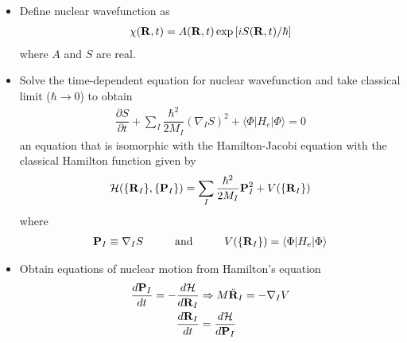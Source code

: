 \documentclass[slidestop,mathserif,compress,xcolor=svgnames]{beamer}
\begin{document}
\begin{frame}
\footnotesize{
\begin{itemize}
\item Define nuclear wavefunction as
\begin{align*}
\chi({\bf R},t) = A({\bf R},t)\exp\left[iS({\bf R},t)/\hbar\right]
\end{align*}
where $A$ and $S$ are real.
\item Solve the time-dependent equation for nuclear wavefunction and take classical limit ($\hbar\rightarrow0$) to obtain 
\begin{align*}
\dfrac{\partial S}{\partial t} + \sum_I\dfrac{\hbar^2}{2M_I}(\nabla_IS)^2 + \langle\Phi|H_e|\Phi\rangle = 0
\end{align*}
an equation that is isomorphic with the Hamilton-Jacobi equation with the classical Hamilton function given by
\begin{align*}
\mathcal{H}(\{{\bf R}_I\},\{{\bf P}_I\}) = \sum_I \dfrac{\hbar^2}{2M_I}{\bf P}^2_I + V(\{{\bf R}_I\})
\end{align*}
where
\begin{align*}
{\bf P}_I \equiv \nabla_IS\hspace{1cm}\mathrm{and}\hspace{1cm}
V(\{{\bf R}_I\}) = \langle\Phi|H_e|\Phi\rangle
\end{align*}
\item Obtain equations of nuclear motion from Hamilton's equation
\begin{align*}
\dfrac{d{\bf P}_I}{dt} = -\dfrac{d\mathcal{H}}{d{\bf R}_I}&\Rightarrow M\ddot{\bf R}_I = -\nabla _IV\\
\dfrac{d{\bf R}_I}{dt} &= \dfrac{d\mathcal{H}}{d{\bf P}_I}
\end{align*}
\end{itemize}
}
\end{frame}
\end{document}
